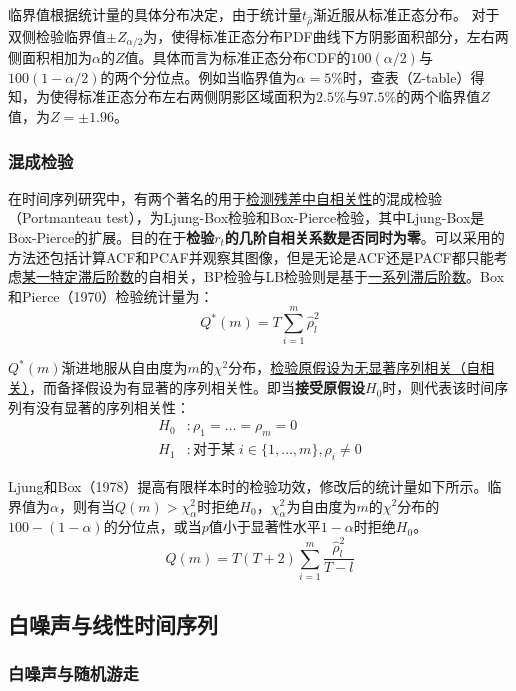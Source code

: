 \documentclass[11pt]{article}
\begin{document}
临界值根据统计量的具体分布决定，由于统计量$t_{\hat{\rho}}$渐近服从标准正态分布。
对于双侧检验临界值$\pm Z_{\alpha/2}$为，使得标准正态分布PDF曲线下方阴影面积部分，左右两侧面积相加为$\alpha$的$Z$值。具体而言为标准正态分布CDF的$100(\alpha/2)$与$100(1-\alpha/2)$的两个分位点。例如当临界值为$\alpha=5\%$时，查表（Z-table）得知，为使得标准正态分布左右两侧阴影区域面积为$2.5\%$与$97.5\%$的两个临界值$Z$值，为$Z=\pm 1.96$。

\subsubsection*{混成检验}

在时间序列研究中，有两个著名的用于\uline{检测残差中自相关性}的混成检验（Portmanteau test），为Ljung-Box检验和Box-Pierce检验，其中Ljung-Box是Box-Pierce的扩展。目的在于\textbf{检验$r_t$的几阶自相关系数是否同时为零}。可以采用的方法还包括计算ACF和PCAF并观察其图像，但是无论是ACF还是PACF都只能考虑\uline{某一特定滞后阶数}的自相关，BP检验与LB检验则是基于\uline{一系列滞后阶数}。Box和Pierce（1970）检验统计量为：
\begin{equation*}
    Q^{*}(m) = T\sum_{i=1}^{m} \hat{\rho}_{l}^{2}
\end{equation*}

$Q^{*}(m)$渐进地服从自由度为$m$的$\chi^2$分布，\uline{检验原假设为无显著序列相关（自相关）}，而备择假设为有显著的序列相关性。即当\textbf{接受原假设}$H_0$时，则代表该时间序列有没有显著的序列相关性：
\begin{align*}
    H_0&: \rho_1=\dots=\rho_{m}=0 \\
    H_1&: \text{对于某}\; i \in \{1,\dots,m\},\rho_i \neq 0
\end{align*}

Ljung和Box（1978）提高有限样本时的检验功效，修改后的统计量如下所示。临界值为$\alpha$，则有当$Q(m)>\chi_{\alpha}^{2}$时拒绝$H_0$，$\chi_{\alpha}^{2}$为自由度为$m$的$\chi^{2}$分布的$100-(1-\alpha)$的分位点，或当$p$值小于显著性水平$1-\alpha$时拒绝$H_0$。
\begin{equation*}
    Q(m) = T(T+2) \sum_{i=1}^{m} \frac{\hat{\rho}_{l}^{2}}{T-l}
\end{equation*}

\subsection{白噪声与线性时间序列}

\subsubsection{白噪声与随机游走}
\end{document}
